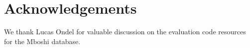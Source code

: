 \documentclass[a4paper]{article}
\begin{document}
\section{Acknowledgements}

We thank Lucas Ondel for valuable discussion on the evaluation code resources for the Mboshi database. \\




 
\end{document}
